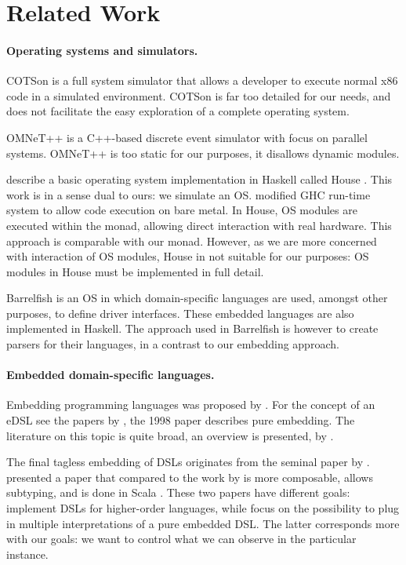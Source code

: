 \section{Related Work}
\label{sec:related-work}

\paragraph{Operating systems and simulators.}
COTSon \cite{cotson} is a full system simulator that allows a developer to execute normal x86 code in a simulated environment.
COTSon is far too detailed for our needs, and does not facilitate the easy exploration of a complete operating system.

OMNeT++ \cite{omnet} is a C++-based discrete event simulator with focus on parallel systems. OMNeT++ is too static for our purposes, it disallows dynamic modules.


\citeauthor{house} describe a basic operating system implementation in Haskell called House \cite{house}.
This work is in a sense dual to ours: we simulate an OS.
\citeauthor{house} modified GHC run-time system to allow code execution on bare metal.
In House, OS modules are executed within the  monad, allowing direct interaction with real hardware.
This approach is comparable with our  monad.
However, as we are more concerned with interaction of OS modules, House in not suitable for our purposes:  OS modules in House must be implemented in full detail.

Barrelfish \cite{barrelfish} is an OS in which domain-specific languages are used, amongst other purposes, to define driver interfaces.
These embedded languages are also implemented in Haskell.
The approach used in Barrelfish is however to create parsers for their languages, in a contrast to our embedding approach.


\paragraph{Embedded domain-specific languages.}
Embedding programming languages was proposed by \citeauthor{Landin:1966:NPL:365230.365257} \cite{Landin:1966:NPL:365230.365257}.
For the concept of an eDSL see the papers by \citeauthor{hudak1} \cite{hudak1,hudak2}, the 1998 paper describes pure embedding.
The literature on this topic is quite broad, an overview is presented, \eg by \citeauthor{dsl-survey} \cite{dsl-survey}.

The final tagless embedding of DSLs originates from the seminal paper by \citeauthor{final_tagless_embedding} \cite{final_tagless_embedding}.
\citeauthor{Hofer:2008:PED:1449913.1449935} \cite{Hofer:2008:PED:1449913.1449935} presented a paper that compared to the work by \citeauthor{final_tagless_embedding} \cite{final_tagless_embedding} is more composable, allows subtyping, and is done in Scala \cite{odersky2008programming}.
These two papers have different goals: \citeauthor{final_tagless_embedding} implement DSLs for higher-order languages, while \citeauthor{Hofer:2008:PED:1449913.1449935} focus on the possibility to plug in multiple interpretations of a pure embedded DSL.
The latter corresponds more with our goals: we want to control  what we can observe in the particular instance.

